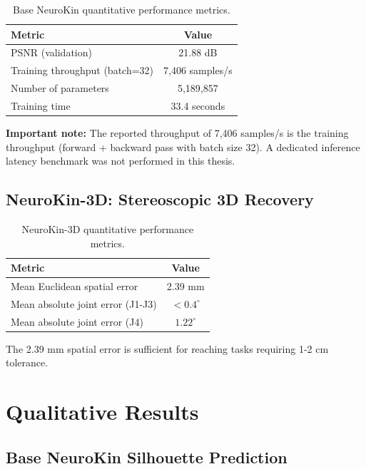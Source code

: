 \documentclass[12pt,a4paper,oneside]{report}
\begin{document}
\begin{table}[H]
\centering
\caption{Base NeuroKin quantitative performance metrics.}
\label{tab:neurokin_performance}
\begin{tabular}{lc}
\toprule
Metric & Value \\
\midrule
PSNR (validation) & 21.88 dB \\
Training throughput (batch=32) & 7,406 samples/s \\
Number of parameters & 5,189,857 \\
Training time & 33.4 seconds \\
\bottomrule
\end{tabular}
\end{table}

\textbf{Important note:} The reported throughput of 7,406 samples/s is the training throughput (forward + backward pass with batch size 32). A dedicated inference latency benchmark was not performed in this thesis.

\subsection{NeuroKin-3D: Stereoscopic 3D Recovery}

\begin{table}[H]
\centering
\caption{NeuroKin-3D quantitative performance metrics.}
\label{tab:neurokin3d_performance}
\begin{tabular}{lc}
\toprule
Metric & Value \\
\midrule
Mean Euclidean spatial error & 2.39 mm \\
Mean absolute joint error (J1-J3) & $<0.4^\circ$ \\
Mean absolute joint error (J4) & $1.22^\circ$ \\
\bottomrule
\end{tabular}
\end{table}

The 2.39 mm spatial error is sufficient for reaching tasks requiring 1-2 cm tolerance.

\section{Qualitative Results}

\subsection{Base NeuroKin Silhouette Prediction}
\end{document}
